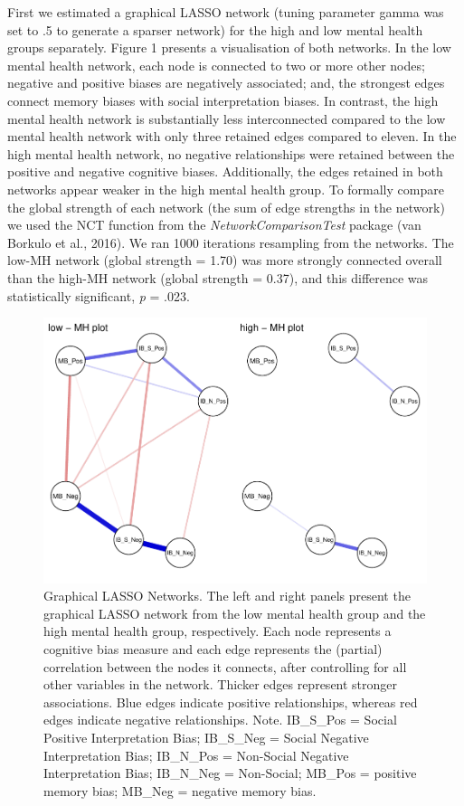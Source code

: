 \documentclass[man,floatsintext]{apa6}
\begin{document}
First we estimated a graphical LASSO network (tuning parameter gamma was set to .5 to generate a sparser network) for the high and low mental health groups separately. Figure 1 presents a visualisation of both networks. In the low mental health network, each node is connected to two or more other nodes; negative and positive biases are negatively associated; and, the strongest edges connect memory biases with social interpretation biases. In contrast, the high mental health network is substantially less interconnected compared to the low mental health network with only three retained edges compared to eleven. In the high mental health network, no negative relationships were retained between the positive and negative cognitive biases. Additionally, the edges retained in both networks appear weaker in the high mental health group. To formally compare the global strength of each network (the sum of edge strengths in the network) we used the NCT function from the \emph{NetworkComparisonTest} package (van Borkulo et al., 2016). We ran 1000 iterations resampling from the networks. The low-MH network (global strength = 1.70) was more strongly connected overall than the high-MH network (global strength = 0.37), and this difference was statistically significant, \emph{p} = .023.

\begin{figure}
\centering
\includegraphics{CCBH-in-adolescence---Network-analysis_files/figure-latex/unnamed-chunk-1-1.pdf}
\caption{\label{fig:unnamed-chunk-1}Graphical LASSO Networks. The left and right panels present the graphical LASSO network from the low mental health group and the high mental health group, respectively. Each node represents a cognitive bias measure and each edge represents the (partial) correlation between the nodes it connects, after controlling for all other variables in the network. Thicker edges represent stronger associations. Blue edges indicate positive relationships, whereas red edges indicate negative relationships.
Note. IB\_S\_Pos = Social Positive Interpretation Bias; IB\_S\_Neg = Social Negative Interpretation Bias; IB\_N\_Pos = Non-Social Negative Interpretation Bias; IB\_N\_Neg = Non-Social; MB\_Pos = positive memory bias; MB\_Neg = negative memory bias.}
\end{figure}
\end{document}
